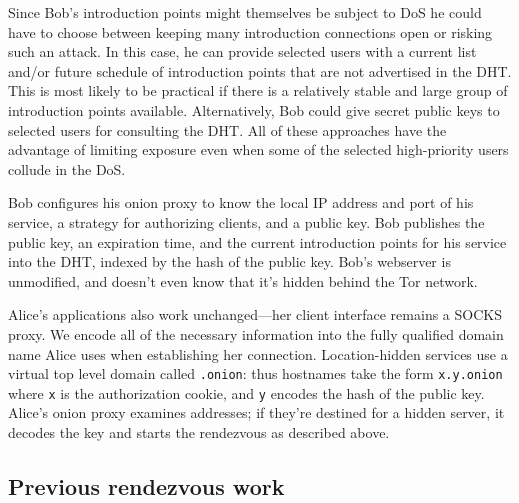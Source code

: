 \documentclass[times,10pt,twocolumn]{article}
\begin{document}
Since Bob's introduction points might themselves be subject to DoS he
could have to choose between keeping many
introduction connections open or risking such an attack. In this case,
he can provide selected users
with a current list and/or future schedule of introduction points that
are not advertised in the DHT\@. This is most likely to be practical
if there is a relatively stable and large group of introduction points
available. Alternatively, Bob could give secret public keys
to selected users for consulting the DHT\@. All of these approaches
have the advantage of limiting exposure even when
some of the selected high-priority users collude in the DoS\@.


Bob configures his onion proxy to know the local IP address and port of his
service, a strategy for authorizing clients, and a public key. Bob
publishes the public key, an expiration time, and
the current introduction points for his service into the DHT, indexed
by the hash of the public key.  Bob's webserver is unmodified,
and doesn't even know that it's hidden behind the Tor network.

Alice's applications also work unchanged---her client interface
remains a SOCKS proxy. We encode all of the necessary information
into the fully qualified domain name Alice uses when establishing her
connection. Location-hidden services use a virtual top level domain
called {\tt .onion}: thus hostnames take the form {\tt x.y.onion} where
{\tt x} is the authorization cookie, and {\tt y} encodes the hash of
the public key. Alice's onion proxy
examines addresses; if they're destined for a hidden server, it decodes
the key and starts the rendezvous as described above.

\subsection{Previous rendezvous work}
\end{document}
